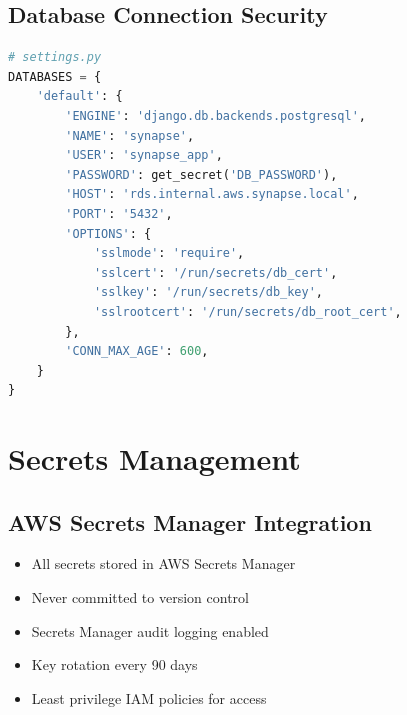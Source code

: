 \documentclass{report}
\begin{document}
\subsection{Database Connection Security}
\begin{lstlisting}[language=Python]
# settings.py
DATABASES = {
    'default': {
        'ENGINE': 'django.db.backends.postgresql',
        'NAME': 'synapse',
        'USER': 'synapse_app',
        'PASSWORD': get_secret('DB_PASSWORD'),
        'HOST': 'rds.internal.aws.synapse.local',
        'PORT': '5432',
        'OPTIONS': {
            'sslmode': 'require',
            'sslcert': '/run/secrets/db_cert',
            'sslkey': '/run/secrets/db_key',
            'sslrootcert': '/run/secrets/db_root_cert',
        },
        'CONN_MAX_AGE': 600,
    }
}
\end{lstlisting}

\section{Secrets Management}

\subsection{AWS Secrets Manager Integration}
\begin{itemize}
\item All secrets stored in AWS Secrets Manager
\item Never committed to version control
\item Secrets Manager audit logging enabled
\item Key rotation every 90 days
\item Least privilege IAM policies for access
\end{itemize}
\end{document}
